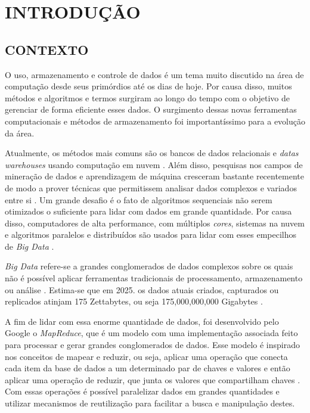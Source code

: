 \chapter{INTRODUÇÃO} \label{cha:introducao}

\section{CONTEXTO} \label{sec:contexto}

O uso, armazenamento e controle de dados é um tema muito discutido na área de computação desde seus primórdios até os dias de hoje. Por causa disso, muitos métodos e algoritmos e termos surgiram ao longo do tempo com o objetivo de gerenciar de forma eficiente esses dados. O surgimento dessas novas ferramentas computacionais e métodos de armazenamento foi importantíssimo para a evolução da área. 

Atualmente, os métodos mais comuns são os bancos de dados relacionais e \textit{datas warehouses} usando computação em nuvem \cite{PastAndFutureTrendsData19}. Além disso, pesquisas nos campos de mineração de dados e aprendizagem de máquina cresceram bastante recentemente de modo a prover técnicas que permitissem analisar dados complexos e variados entre si \cite{ProgrammingBigData22}. Um grande desafio é o fato de algoritmos sequenciais não serem otimizados o suficiente para lidar com dados em grande quantidade. Por causa disso, computadores de alta performance, com múltiplos \textit{cores}, sistemas na nuvem e algoritmos paralelos e distribuídos são usados para lidar com esses empecilhos de \textit{Big Data} \cite{ProgrammingBigData22}.

\textit{Big Data} refere-se a grandes conglomerados de dados complexos sobre os quais não é possível aplicar ferramentas tradicionais de processamento, armazenamento ou análise \cite{OptmizationSoftwareHadoop18}. Estima-se que em 2025. os dados atuais criados, capturados ou replicados atinjam 175 Zettabytes, ou seja 175,000,000,000 Gigabytes \cite{DigitalizationWorld18}.

A fim de lidar com essa enorme quantidade de dados, foi desenvolvido pelo Google o \textit{MapReduce}, que é um modelo com uma implementação associada feito para processar e gerar grandes conglomerados de dados. Esse modelo é inspirado nos conceitos de mapear e reduzir, ou seja, aplicar uma operação que conecta cada item da base de dados a um determinado par de chaves e valores e então aplicar uma operação de reduzir, que junta os valores que compartilham chaves \cite{MapReduce04}. Com essas operações é possível paralelizar dados em grandes quantidades e utilizar mecanismos de reutilização para facilitar a busca e manipulação destes.

